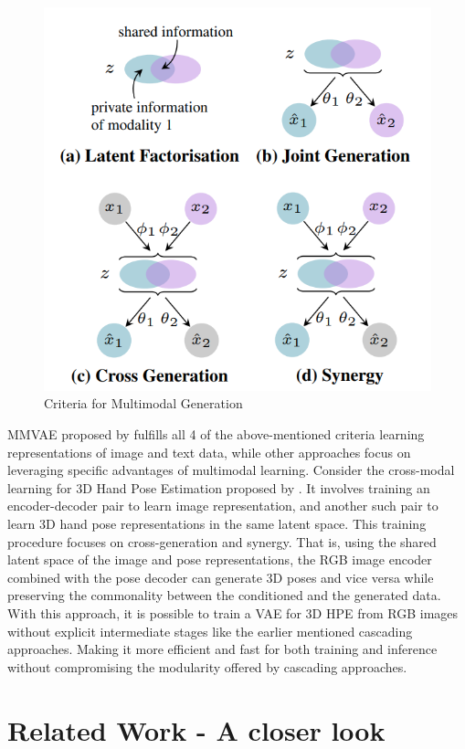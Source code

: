 \begin{figure}[!h]
    \centering
    \includegraphics[scale=0.4]{figures/criteria.png}
    \caption{Criteria for Multimodal Generation \cite{MMVAE}}
    \label{fig:criteria}
\end{figure}

\ac{MMVAE} proposed by \cite{MMVAE} fulfills all 4 of the above-mentioned criteria learning representations of image and text data, while other approaches focus on leveraging specific advantages of multimodal learning. Consider the cross-modal learning for 3D Hand Pose Estimation proposed by \cite{crossmodal}. It involves training an encoder-decoder pair to learn image representation, and another such pair to learn 3D hand pose representations in the same latent space. This training procedure focuses on cross-generation and synergy. That is, using the shared latent space of the image and pose representations, the \ac{RGB} image encoder combined with the pose decoder can generate 3D poses and vice versa while preserving the commonality between the conditioned and the generated data. With this approach, it is possible to train a \ac{VAE} for 3D \ac{HPE} from \ac{RGB} images without explicit intermediate stages like the earlier mentioned cascading approaches. Making it more efficient and fast for both training and inference without compromising the modularity offered by cascading approaches.

\section{Related Work - A closer look}
\label{section:Related Work}
\lipsum[1-5] %

